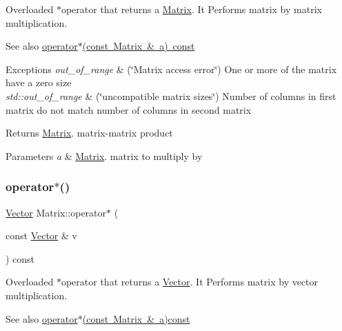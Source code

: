 Overloaded $\ast$operator that returns a \mbox{\hyperlink{classMatrix}{Matrix}}. It Performs matrix by matrix multiplication. \begin{DoxySeeAlso}{See also}
\mbox{\hyperlink{classMatrix_aaa40c78e6b3bb5bbf572d35612dbf6a7}{operator$\ast$(const Matrix \& a) const}} 
\end{DoxySeeAlso}

\begin{DoxyExceptions}{Exceptions}
{\em out\+\_\+of\+\_\+range} & (\char`\"{}\+Matrix access error\char`\"{}) One or more of the matrix have a zero size \\
\hline
{\em std\+::out\+\_\+of\+\_\+range} & (\char`\"{}uncompatible matrix sizes\char`\"{}) Number of columns in first matrix do not match number of columns in second matrix \\
\hline
\end{DoxyExceptions}
\begin{DoxyReturn}{Returns}
\mbox{\hyperlink{classMatrix}{Matrix}}. matrix-\/matrix product 
\end{DoxyReturn}

\begin{DoxyParams}{Parameters}
{\em a} & \mbox{\hyperlink{classMatrix}{Matrix}}. matrix to multiply by \\
\hline
\end{DoxyParams}
\mbox{\label{classMatrix_a843eebe2b6bd9d8091be600f685252cb}} 
\subsubsection{\texorpdfstring{operator$\ast$()}{operator*()}\hspace{0.1cm}{\footnotesize\ttfamily [2/2]}}
{\footnotesize\ttfamily \mbox{\hyperlink{classVector}{Vector}} Matrix\+::operator$\ast$ (\begin{DoxyParamCaption}\item[{const \mbox{\hyperlink{classVector}{Vector}} \&}]{v }\end{DoxyParamCaption}) const}

Overloaded $\ast$operator that returns a \mbox{\hyperlink{classVector}{Vector}}. It Performs matrix by vector multiplication. \begin{DoxySeeAlso}{See also}
\mbox{\hyperlink{classMatrix_aaa40c78e6b3bb5bbf572d35612dbf6a7}{operator$\ast$(const Matrix \& a)const}} 
\end{DoxySeeAlso}

